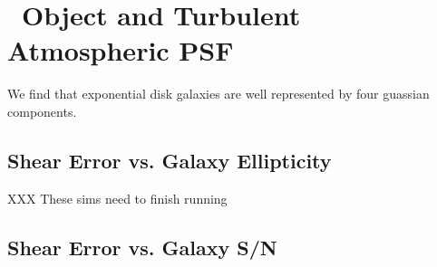 \documentclass[10pt,preprint]{aastex}
\newcommand{\psf}{PSF}
\begin{document}
\section{\devauc\ Object and Turbulent Atmospheric \psf}

We find that exponential disk galaxies are well represented by four guassian
components.

\subsection{Shear Error vs. Galaxy Ellipticity}


XXX These sims need to finish running



\subsection{Shear Error vs. Galaxy S/N}
\end{document}
